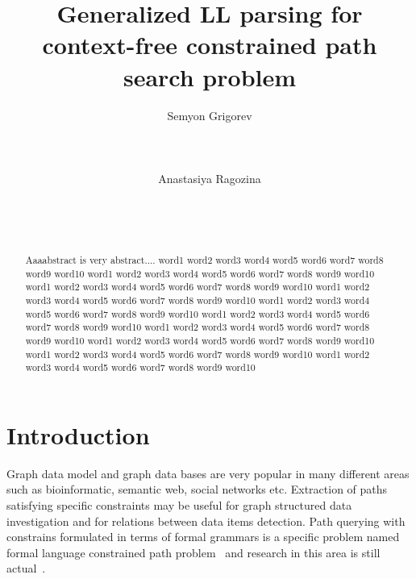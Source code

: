 \documentclass{sig-alternate} %
\begin{document}
\makeatletter
\def\@copyrightspace{\relax}
\makeatother

\title{Generalized LL parsing for context-free constrained path search problem}

\sloppy


\author{
\alignauthor
       Semyon Grigorev\\
       \\
       \\
       \\
\alignauthor
       Anastasiya Ragozina\\
       \\
       \\
       \\
}

\maketitle

\begin{abstract}
Aaaabstract is very abstract.... 
word1 word2 word3 word4 word5 word6 word7 word8 word9 word10
word1 word2 word3 word4 word5 word6 word7 word8 word9 word10
word1 word2 word3 word4 word5 word6 word7 word8 word9 word10
word1 word2 word3 word4 word5 word6 word7 word8 word9 word10
word1 word2 word3 word4 word5 word6 word7 word8 word9 word10
word1 word2 word3 word4 word5 word6 word7 word8 word9 word10
word1 word2 word3 word4 word5 word6 word7 word8 word9 word10
word1 word2 word3 word4 word5 word6 word7 word8 word9 word10
word1 word2 word3 word4 word5 word6 word7 word8 word9 word10
word1 word2 word3 word4 word5 word6 word7 word8 word9 word10

\end{abstract}

\section{Introduction}
Graph data model and graph data bases are very popular in many different areas such as bioinformatic, semantic web, social networks etc.
Extraction of paths satisfying specific constraints may be useful for graph structured data investigation and for relations between data items detection.
Path querying with constrains formulated in terms of formal grammars is a specific problem named formal language constrained path problem~\cite{FLCpathProblem} and research in this area is still actual~\cite{DirOfBigGraphAnalysis}.
\end{document}
